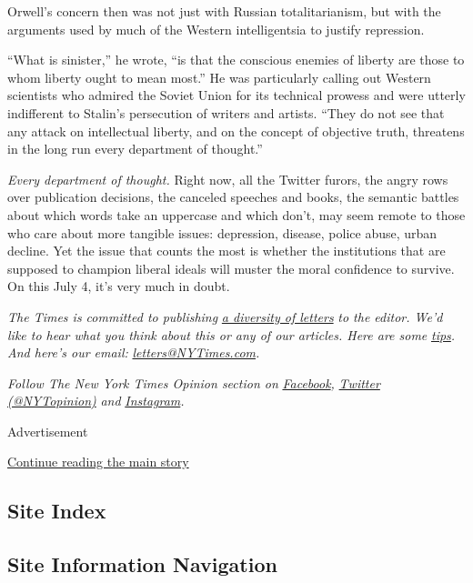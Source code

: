 Orwell's concern then was not just with Russian totalitarianism, but
with the arguments used by much of the Western intelligentsia to justify
repression.

``What is sinister,'' he wrote, ``is that the conscious enemies of
liberty are those to whom liberty ought to mean most.'' He was
particularly calling out Western scientists who admired the Soviet Union
for its technical prowess and were utterly indifferent to Stalin's
persecution of writers and artists. ``They do not see that any attack on
intellectual liberty, and on the concept of objective truth, threatens
in the long run every department of thought.''

\emph{Every department of thought.} Right now, all the Twitter furors,
the angry rows over publication decisions, the canceled speeches and
books, the semantic battles about which words take an uppercase and
which don't, may seem remote to those who care about more tangible
issues: depression, disease, police abuse, urban decline. Yet the issue
that counts the most is whether the institutions that are supposed to
champion liberal ideals will muster the moral confidence to survive. On
this July 4, it's very much in doubt.

\emph{The Times is committed to publishing}
\href{https://www.nytimes3xbfgragh.onion/2019/01/31/opinion/letters/letters-to-editor-new-york-times-women.html}{\emph{a
diversity of letters}} \emph{to the editor. We'd like to hear what you
think about this or any of our articles. Here are some}
\href{https://help.nytimes3xbfgragh.onion/hc/en-us/articles/115014925288-How-to-submit-a-letter-to-the-editor}{\emph{tips}}\emph{.
And here's our email:}
\href{mailto:letters@NYTimes.com}{\emph{letters@NYTimes.com}}\emph{.}

\emph{Follow The New York Times Opinion section on}
\href{https://www.facebookcorewwwi.onion/nytopinion}{\emph{Facebook}}\emph{,}
\href{http://twitter.com/NYTOpinion}{\emph{Twitter (@NYTopinion)}}
\emph{and}
\href{https://www.instagram.com/nytopinion/}{\emph{Instagram}}\emph{.}

Advertisement

\protect\hyperlink{after-bottom}{Continue reading the main story}

\hypertarget{site-index}{%
\subsection{Site Index}\label{site-index}}

\hypertarget{site-information-navigation}{%
\subsection{Site Information
Navigation}\label{site-information-navigation}}

